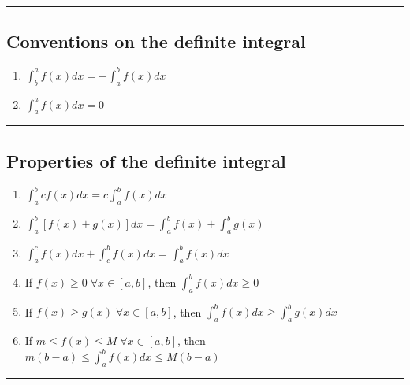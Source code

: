 \documentclass[
  landscape,  
  10pt,
]{article}
\begin{document}
\begin{multicols}{3}
\begin{center}\rule{0.5\linewidth}{0.5pt}\end{center}

\hypertarget{conventions-on-the-definite-integral}{%
\subsection{Conventions on the definite
integral}\label{conventions-on-the-definite-integral}}

\begin{enumerate}
\def\labelenumi{\arabic{enumi}.}
\item
  \(\displaystyle\int_b^a f(x)dx = -\int_a^b f(x)dx\)
\item
  \(\displaystyle\int_a^a f(x)dx = 0\)
\end{enumerate}

\begin{center}\rule{0.5\linewidth}{0.5pt}\end{center}

\hypertarget{properties-of-the-definite-integral}{%
\subsection{Properties of the definite
integral}\label{properties-of-the-definite-integral}}

\begin{enumerate}
\def\labelenumi{\arabic{enumi}.}
\item
  \(\displaystyle\int_a^b cf(x)dx = c\int_a^b f(x)dx\)
\item
  \(\displaystyle\int_a^b [f(x) \pm g(x)] dx = \int_a^b f(x) \pm \int_a^b g(x)\)
\item
  \(\displaystyle\int_a^c f(x)dx + \int_c^b f(x)dx = \int_a^b f(x)dx\)
\item
  If \(f(x)\geq0 \;\forall x \in[a,b]\), then
  \(\displaystyle\int_a^b f(x)dx \geq 0\)
\item
  If \(f(x) \geq g(x)\;\forall x\in[a,b]\), then
  \(\displaystyle\int_a^b f(x)dx \geq \int_a^b g(x)dx\)
\item
  If \(m \leq f(x) \leq M \;\forall x\in[a,b]\), then
  \(\displaystyle m(b-a) \leq \int_a^b f(x)dx \leq M(b-a)\)
\end{enumerate}

\begin{center}\rule{0.5\linewidth}{0.5pt}\end{center}

\hypertarget{mean-value-theorem-integrals}{%
}
\end{multicols}
\end{document}
